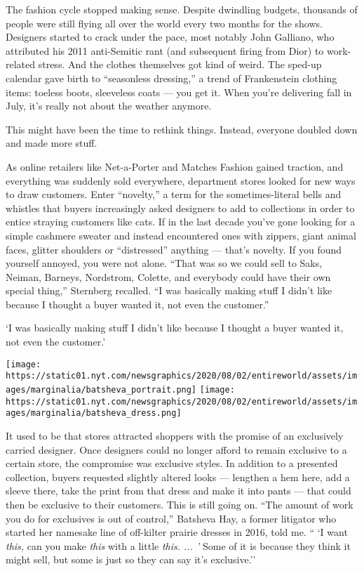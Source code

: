 The fashion cycle stopped making sense. Despite dwindling budgets,
thousands of people were still flying all over the world every two
months for the shows. Designers started to crack under the pace, most
notably John Galliano, who attributed his 2011 anti-Semitic rant (and
subsequent firing from Dior) to work-related stress. And the clothes
themselves got kind of weird. The sped-up calendar gave birth to
``seasonless dressing,'' a trend of Frankenstein clothing items: toeless
boots, sleeveless coats --- you get it. When you're delivering fall in
July, it's really not about the weather anymore.

This might have been the time to rethink things. Instead, everyone
doubled down and made more stuff.

As online retailers like Net-a-Porter and Matches Fashion gained
traction, and everything was suddenly sold everywhere, department stores
looked for new ways to draw customers. Enter ``novelty,'' a term for the
sometimes-literal bells and whistles that buyers increasingly asked
designers to add to collections in order to entice straying customers
like cats. If in the last decade you've gone looking for a simple
cashmere sweater and instead encountered ones with zippers, giant animal
faces, glitter shoulders or ``distressed'' anything --- that's novelty.
If you found yourself annoyed, you were not alone. ``That was so we
could sell to Saks, Neiman, Barneys, Nordstrom, Colette, and everybody
could have their own special thing,'' Sternberg recalled. ``I was
basically making stuff I didn't like because I thought a buyer wanted
it, not even the customer.''

`I was basically making stuff I didn't like because I thought a buyer
wanted it, not even the customer.'

\texttt{[image: https://static01.nyt.com/newsgraphics/2020/08/02/entireworld/assets/images/marginalia/batsheva\_portrait.png]}
\texttt{[image: https://static01.nyt.com/newsgraphics/2020/08/02/entireworld/assets/images/marginalia/batsheva\_dress.png]}

It used to be that stores attracted shoppers with the promise of an
exclusively carried designer. Once designers could no longer afford to
remain exclusive to a certain store, the compromise was exclusive
styles. In addition to a presented collection, buyers requested slightly
altered looks --- lengthen a hem here, add a sleeve there, take the
print from that dress and make it into pants --- that could then be
exclusive to their customers. This is still going on. ``The amount of
work you do for exclusives is out of control,'' Batsheva Hay, a former
litigator who started her namesake line of off-kilter prairie dresses in
2016, told me. `` `I want \emph{this,} can you make \emph{this} with a
little \emph{this. ... '} Some of it is because they think it might
sell, but some is just so they can say it's exclusive.''

